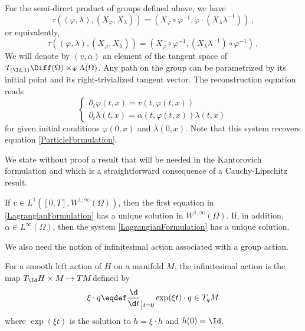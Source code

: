\begin{example}
For the semi-direct product of groups defined above, we have 
\begin{equation}
\tau((\varphi,\lambda),(X_\varphi, X_\lambda)) = (X_\varphi \circ \varphi^{-1},\varphi \cdot (X_\lambda \lambda^{-1}))\,,
\end{equation}
or equivalently, 
\begin{equation}
\tau((\varphi,\lambda),(X_\varphi, X_\lambda)) = (X_\varphi \circ \varphi^{-1}, (X_\lambda \lambda^{-1}) \circ \varphi^{-1})\,,
\end{equation}
We will denote by $(v,\alpha)$ an element of the tangent space of $T_{(\Id,1)}\Diff(\Omega) \ltimes_\Psi \Lambda(\Omega)$.
Any path on the group can be parametrized by its initial point and its right-trivialized tangent vector. The reconstruction equation reads
\begin{equation}\label{LagrangianFormulation}
\begin{cases}
\partial_t \varphi(t,x)= v(t,\varphi(t,x))\\
\partial_t \lambda(t,x) = \alpha(t,\varphi(t,x)) \lambda(t,x)
\end{cases}
\end{equation}
for given initial conditions $\varphi(0,x)$ and $\lambda(0,x)$.
Note that this system recovers equation \eqref{ParticleFormulation}.
\end{example}

We state without proof a result that will be needed in the Kantorovich formulation and which is a straightforward consequence of a Cauchy-Lipschitz result.

\begin{proposition}\label{CauchyLipschitz}
If $v\in L^1([0,T],W^{1,\infty}(\Omega))$, then the first equation in \eqref{LagrangianFormulation} has a unique solution in $W^{1,\infty}(\Omega)$.
%
If, in addition, $\alpha \in L^\infty(\Omega)$, then the system \eqref{LagrangianFormulation} has a unique solution.
\end{proposition}

We also need the notion of infinitesimal action associated with a group action.

\begin{definition}
For a smooth left action of $H$ on a manifold $M$, the infinitesimal action is the map $T_{\Id} H \times M \mapsto TM $defined by
\begin{equation}
\xi \cdot q \eqdef \frac {\d}{\d t}_{\big| t=0} \exp (\xi t) \cdot q \in T_qM
\end{equation}
where $\exp(\xi t)$ is the solution to $\dot{h} = \xi \cdot h$ and $h(0) = \Id$.
\end{definition}


